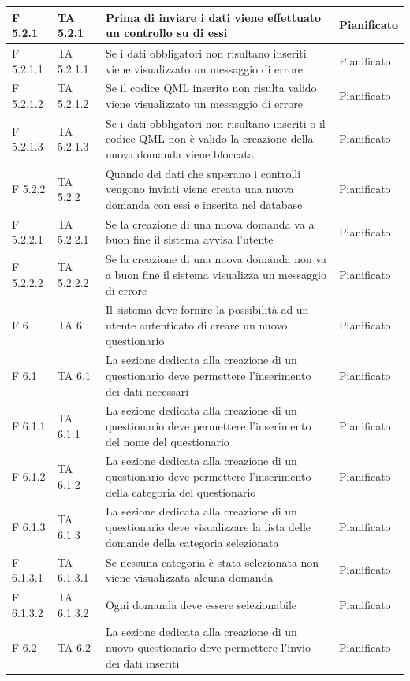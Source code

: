 \documentclass[a4paper,11pt]{article}
\begin{document}
\begin{longtable}{p{}p{}p{}p{}}
\midrule
F 5.2.1 & TA 5.2.1&Prima di inviare i dati viene effettuato un controllo su di essi & Pianificato\\
\midrule
F 5.2.1.1 & TA 5.2.1.1 &Se i dati obbligatori non risultano inseriti viene visualizzato un messaggio di errore & Pianificato\\
\midrule
F 5.2.1.2 & TA 5.2.1.2 &Se il codice QML inserito non risulta valido viene visualizzato un messaggio di errore & Pianificato\\
\midrule
F 5.2.1.3 &TA 5.2.1.3 &Se i dati obbligatori non risultano inseriti o il codice QML non è valido la creazione della nuova domanda viene bloccata & Pianificato\\
\midrule
F 5.2.2 & TA 5.2.2 &Quando dei dati che superano i controlli vengono inviati viene creata una nuova domanda con essi e inserita nel database & Pianificato\\
\midrule
F 5.2.2.1 & TA 5.2.2.1 &Se la creazione di una nuova domanda va a buon fine il sistema avvisa l'utente & Pianificato\\
\midrule
F 5.2.2.2 & TA 5.2.2.2 & Se la creazione di una nuova domanda non va a buon fine il sistema visualizza un messaggio di errore & Pianificato\\
\midrule
F 6 & TA 6&Il sistema deve fornire la possibilità ad un utente autenticato di creare un nuovo questionario & Pianificato\\
\midrule
F 6.1 &TA 6.1&La sezione dedicata alla creazione di un questionario deve permettere l'inserimento dei dati necessari & Pianificato\\
\midrule
F 6.1.1 & TA 6.1.1&La sezione dedicata alla creazione di un questionario deve permettere l'inserimento del nome del questionario & Pianificato\\
\midrule
F 6.1.2 &TA 6.1.2 &La sezione dedicata alla creazione di un questionario deve permettere l'inserimento della categoria del questionario & Pianificato\\
\midrule
F 6.1.3 &TA 6.1.3 &La sezione dedicata alla creazione di un questionario deve visualizzare la lista delle domande della categoria selezionata & Pianificato\\
\midrule
F 6.1.3.1 &TA 6.1.3.1 &Se nessuna categoria è stata selezionata non viene visualizzata alcuna domanda & Pianificato\\
\midrule
F 6.1.3.2 & TA 6.1.3.2 &Ogni domanda deve essere selezionabile & Pianificato\\
\midrule
F 6.2 & TA 6.2 &La sezione dedicata alla creazione di un nuovo questionario deve permettere l'invio dei dati inseriti & Pianificato\\

\end{longtable}
\end{document}
